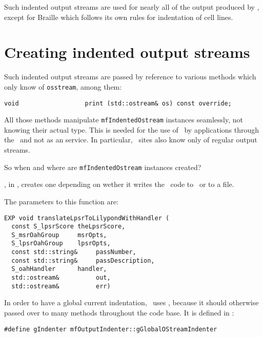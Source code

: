 Such indented output streams are used for nearly all of the output produced by \mf, except for Braille which follows its own rules for indentation of cell lines.


\section{Creating indented output streams}

Such indented output streams are passed by reference to various methods which only know of {\tt osstream}, among them:
\begin{lstlisting}[language=CPlusPlus]
    void                  print (std::ostream& os) const override;
\end{lstlisting}

All those methods manipulate {\tt mfIndentedOstream} instances seamlessly, not knowing their actual type.
This is needed for the use of \mf\ by applications through the \API\ and not as an service. In particular, \Web\ sites also know only of regular output streams.

So when and where are {\tt mfIndentedOstream} instances created?

, in , creates one depending on wether it writes the \lily\ code to \standardOutput\ or to a file.

The parameters to this function are:
\begin{lstlisting}[language=CPlusPlus]
EXP void translateLpsrToLilypondWithHandler (
  const S_lpsrScore theLpsrScore,
  S_msrOahGroup     msrOpts,
  S_lpsrOahGroup    lpsrOpts,
  const std::string&     passNumber,
  const std::string&     passDescription,
  S_oahHandler      handler,
  std::ostream&          out,
  std::ostream&          err)
\end{lstlisting}

In order to have a global current indentation, \mf\ uses , because it should otherwise passed over to many methods throughout the code base. It is defined in :
\begin{lstlisting}[language=CPlusPlus]
#define gIndenter mfOutputIndenter::gGlobalOStreamIndenter
\end{lstlisting}

